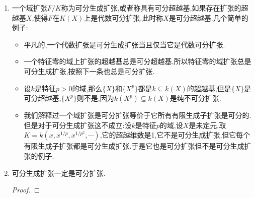 \begin{enumerate}
\begin{proof}
		(a)$\Rightarrow$(b):任取$\alpha\in F$,设它在$k$上的极小多项式为$p(X)$.取$k'=k(\alpha)=k[X]/(p(X))$,那么$F\otimes_kk'=F[X]/(p(X))$是既约环,那么$p(X)$在$F$中做唯一分解后$(X-\alpha)$的次数只能是1次,否则就和既约矛盾.这说明$\alpha$是可分元(一个不可约多项式在代数闭包中的分解应该是可分维数个不同的根,每个根的重数是纯不可分维数,所以$\alpha$的重数是1保证了$p(X)$是可分多项式).
		
		\qquad
		
		(b)$\Rightarrow$(a):我们解释过归结为证$F$的每个有限生成$k$子代数都在$k$上可分.但是每个有限生成$k$子代数肯定包含在$F$的某个有限生成$k$子域中,所以归结为证$F$的每个有限生成$k$子域都在$k$上可分,也即归结为设$F/k$本身是(常义的)有限可分扩张.那么按照本原元定理,就有$\alpha\in F$使得$F=k(\alpha)$,设$\alpha$在$k$上的极小多项式为$p(X)$,那么这是一个可分多项式.对$k$的任意域扩张$k'$,我们有$F\otimes_kk'=k[X]/(p(X))\otimes_kk'=k'[X]/(p(X))$.由于$p(X)$是可分多项式,它在每个扩域$k'$中也是可分的,即做唯一分解后不可约因式的次数都是1,设$p(X)$在$k'$中分解为$p_1(X)\cdots p_r(X)$,其中每个$p_i(X)$都是$k'$中的不可约多项式,并且$p_i(X)$两两不同.于是有如下分解,这是一个既约环,于是$F$在$k$上可分.
		$$k'[X]/(p(X))\cong k'[X]/(p_1(X))\times k'[X]/(p_2(X))\times\cdots\times k'[X]/(p_r(X))$$
	\end{proof}
	\item 一个域扩张$F/K$称为可分生成扩张,或者称具有可分超越基,如果存在扩张的超越基$X$,使得$F$在$K(X)$上是代数可分扩张.此时称$X$是可分超越基.几个简单的例子:
	\begin{itemize}
		\item 平凡的,一个代数扩张是可分生成扩张当且仅当它是代数可分扩张.
		\item 一个特征零的域上扩张的超越基总是可分超越基,所以特征零的域扩张总是可分生成扩张,按照下一条也总是可分扩张.
		\item 设$k$是特征$p>0$的域,那么$\{X\}$和$\{X^p\}$都是$k\subseteq k(X)$的超越基,但是$\{X\}$是可分超越基,$\{X^p\}$则不是,因为$k(X^p)\subseteq k(X)$是纯不可分扩张.
		\item 我们解释过一个域扩张是可分扩张等价于它所有有限生成子扩张是可分的.但是对于可分生成扩张这不成立:设$k$是特征$p$的域,设$X$是未定元,取$K=k(x,x^{1/p},x^{1/p^2},\cdots)$,它的超越维数是1,它不是可分生成扩张,但它每个有限生成子扩张都是可分生成扩张.于是它也是可分扩张但不是可分生成扩张的例子.
	\end{itemize}
	\item 可分生成扩张一定是可分扩张.
	\begin{proof}
		

\end{proof}
\end{enumerate}

